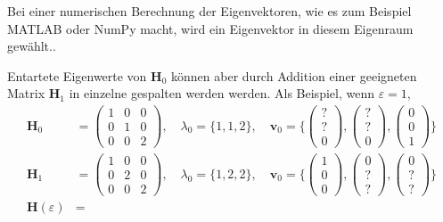 Bei einer numerischen Berechnung der Eigenvektoren, wie es zum Beispiel MATLAB oder NumPy macht, wird ein Eigenvektor in diesem Eigenraum gewählt..

Entartete Eigenwerte von $\bm H_0$ können aber durch Addition einer geeigneten Matrix $\bm H_1$ in einzelne gespalten werden werden.
Als Beispiel, wenn $\varepsilon = 1$, 
\begin{align}
    \bm H_0 &= 
    \begin{pmatrix}
        1 & 0 & 0\\
        0 & 1 & 0\\
        0 & 0 & 2
    \end{pmatrix},
    \quad
    \lambda_0 = \{1, 1, 2\},
    \quad
    \bm v_0 = \{
    \begin{pmatrix}
        ?\\
        ?\\
        0
    \end{pmatrix},
    \begin{pmatrix}
        ?\\
        ?\\
        0
    \end{pmatrix},
    \begin{pmatrix}
        0\\
        0\\
        1
    \end{pmatrix}
    \}
    \\
    \bm H_1 &= 
    \begin{pmatrix}
        1 & 0 & 0\\
        0 & 2 & 0\\
        0 & 0 & 2
    \end{pmatrix},
    \quad
    \lambda_0 = \{1, 2, 2\},
    \quad
    \bm v_0 = \{
    \begin{pmatrix}
        1\\
        0\\
        0
    \end{pmatrix},
    \begin{pmatrix}
        0\\
        ?\\
        ?
    \end{pmatrix},
    \begin{pmatrix}
        0\\
        ?\\
        ?
    \end{pmatrix}
    \}
    \\
    \bm H(\varepsilon) &= 

\end{align}
